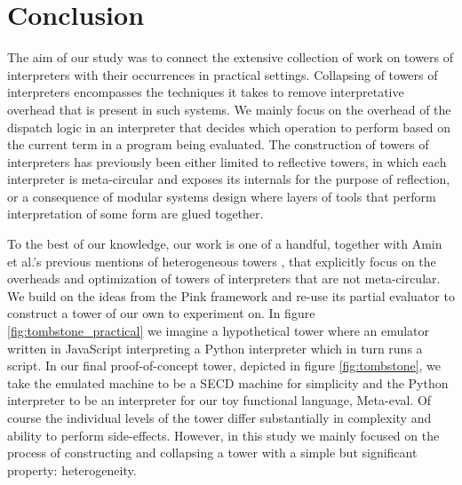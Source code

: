 \documentclass[a4paper,12pt,twoside,openright]{report}
\theoremstyle{definition}
\begin{document}
\section{Conclusion}\label{sec:conclusion}
The aim of our study was to connect the extensive collection of work on towers of interpreters with their occurrences in practical settings. Collapsing of towers of interpreters encompasses the techniques it takes to remove interpretative overhead that is present in such systems. We mainly focus on the overhead of the dispatch logic in an interpreter that decides which operation to perform based on the current term in a program being evaluated. The construction of towers of interpreters has previously been either limited to reflective towers, in which each interpreter is meta-circular and exposes its internals for the purpose of reflection, or a consequence of modular systems design where layers of tools that perform interpretation of some form are glued together.

To the best of our knowledge, our work is one of a handful, together with Amin et al.'s previous mentions of heterogeneous towers \cite{amin2017collapsing}, that explicitly focus on the overheads and optimization of towers of interpreters that are not meta-circular. We build on the ideas from the Pink framework and re-use its partial evaluator to construct a tower of our own to experiment on. In figure \ref{fig:tombstone_practical} we imagine a hypothetical tower where an emulator written in JavaScript interpreting a Python interpreter which in turn runs a script. In our final proof-of-concept tower, depicted in figure \ref{fig:tombstone}, we take the emulated machine to be a SECD machine for simplicity and the Python interpreter to be an interpreter for our toy functional language, Meta-eval. Of course the individual levels of the tower differ substantially in complexity and ability to perform side-effects. However, in this study we mainly focused on the process of constructing and collapsing a tower with a simple but significant property: heterogeneity.
\end{document}
